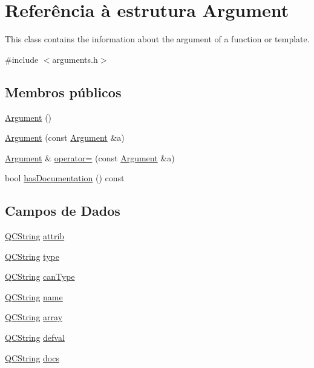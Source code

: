 \hypertarget{struct_argument}{\section{Referência à estrutura Argument}
\label{struct_argument}
}


This class contains the information about the argument of a function or template.  




{\ttfamily \#include $<$arguments.\-h$>$}

\subsection*{Membros públicos}
\begin{DoxyCompactItemize}
\item 
\hyperlink{struct_argument_aedc8c00f523413f83bf6652cbd05bf30}{Argument} ()
\item 
\hyperlink{struct_argument_a60b6d8d358684db956863c177c00ee90}{Argument} (const \hyperlink{struct_argument}{Argument} \&a)
\item 
\hyperlink{struct_argument}{Argument} \& \hyperlink{struct_argument_aea8e40db597c56e0dd885bb20b33280c}{operator=} (const \hyperlink{struct_argument}{Argument} \&a)
\item 
bool \hyperlink{struct_argument_a585dcd381ab70014568db8ad457fc8b1}{has\-Documentation} () const 
\end{DoxyCompactItemize}
\subsection*{Campos de Dados}
\begin{DoxyCompactItemize}
\item 
\hyperlink{class_q_c_string}{Q\-C\-String} \hyperlink{struct_argument_a568fa5bb9141551201cb4822cc8ae7b7}{attrib}
\item 
\hyperlink{class_q_c_string}{Q\-C\-String} \hyperlink{struct_argument_a0d4463771e24026060ae68b04822d7af}{type}
\item 
\hyperlink{class_q_c_string}{Q\-C\-String} \hyperlink{struct_argument_a74d54ffc237b2b850e50345e7c8fa3a4}{can\-Type}
\item 
\hyperlink{class_q_c_string}{Q\-C\-String} \hyperlink{struct_argument_adc0097c7bd1e61ad32058fcde425bc7a}{name}
\item 
\hyperlink{class_q_c_string}{Q\-C\-String} \hyperlink{struct_argument_a86c3f26165f8d189358a5496e71a929d}{array}
\item 
\hyperlink{class_q_c_string}{Q\-C\-String} \hyperlink{struct_argument_a838035f10d60ad8fc6923ab1bb3f3e51}{defval}
\item 
\hyperlink{class_q_c_string}{Q\-C\-String} \hyperlink{struct_argument_a19e06f4d6586ea625f163986a2604c36}{docs}
\end{DoxyCompactItemize}


